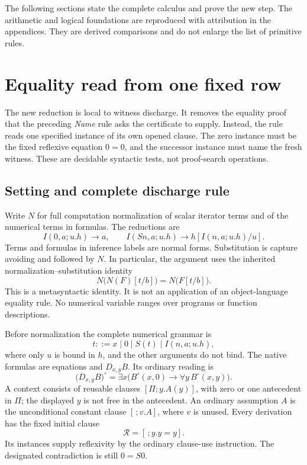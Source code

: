 \documentclass[11pt,letterpaper]{article}
\theoremstyle{definition}\newtheorem{definition}[theorem]{Definition}
\theoremstyle{remark}\newtheorem{remark}[theorem]{Remark}
\begin{document}
The following sections state the complete calculus and prove the new step.
The arithmetic and logical foundations are reproduced with attribution in
the appendices. They are derived comparisons and do not enlarge the list of
primitive rules.


\section{Equality read from one fixed row}
\label{sec:first-row-mathematics}

The new reduction is local to witness discharge.  It removes the equality
proof that the preceding \emph{Name} rule asks the certificate to supply.
Instead, the rule reads one specified instance of its own opened clause.
The zero instance must be the fixed reflexive equation $0=0$, and the
successor instance must name the fresh witness.  These are decidable
syntactic tests, not proof-search operations.

\subsection{Setting and complete discharge rule}

Write $N$ for full computation normalization of scalar iterator terms and
of the numerical terms in formulas.  The reductions are
\[
 I(0,a;u.h)\longrightarrow a,
 \qquad
 I(Sn,a;u.h)\longrightarrow h[I(n,a;u.h)/u].
\]
Terms and formulas in inference labels are normal forms.  Substitution is
capture avoiding and followed by $N$.  In particular, the argument uses
the inherited normalization--substitution identity
\begin{equation}
 N\bigl(N(F)[t/b]\bigr)=N\bigl(F[t/b]\bigr).
 \label{eq:row-normalization-coherence}
\end{equation}
This is a metasyntactic identity.  It is not an application of an
object-language equality rule.  No numerical variable ranges over
programs or function descriptions.

Before normalization the complete numerical grammar is
\[t::=x\mid 0\mid S(t)\mid I(n,a;u.h),\]
where only $u$ is bound in $h$, and the other arguments do not bind.
The native formulas are equations and $D_{x,y}B$.  Its ordinary reading is
\[
 \bigl(D_{x,y}B\bigr)^\circ
   =\exists x\bigl(B^\circ(x,0)\to\forall y\,B^\circ(x,y)\bigr).
\]
A context consists of reusable clauses $[\Pi;y.A(y)]$, with zero or one
antecedent in $\Pi$; the displayed $y$ is not free in the antecedent.
An ordinary assumption $A$ is the unconditional constant clause
$[\,;v.A]$, where $v$ is unused.  Every derivation has the fixed initial
clause
\[
                    \mathcal R=[\,;y.y=y].
\]
Its instances supply reflexivity by the ordinary clause-use instruction.
The designated contradiction is still $0=S0$.
\end{document}
